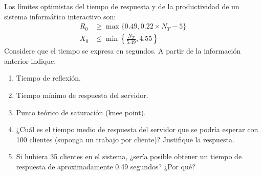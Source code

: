 \begin{ejercicio}\label{ej:5.18}
    Los límites optimistas del tiempo de respuesta y de la productividad de un sistema informático interactivo son:
    \begin{align*}
        R_0 &\geq \max\{0.49, 0.22 \times N_T - 5\} \\
        X_0 &\leq \min\left\{\frac{N_T}{5.49}, 4.55\right\}
    \end{align*}
    Considere que el tiempo se expresa en segundos. A partir de la información anterior indique:
    \begin{enumerate}
        \item Tiempo de reflexión.
        \item Tiempo mínimo de respuesta del servidor.
        \item Punto teórico de saturación (knee point).
        \item ¿Cuál es el tiempo medio de respuesta del servidor que se podría esperar con 100 clientes (suponga un trabajo por cliente)? Justifique la respuesta.
        \item Si hubiera 35 clientes en el sistema, ¿sería posible obtener un tiempo de respuesta de aproximadamente 0.49 segundos? ¿Por qué?
    \end{enumerate}
\end{ejercicio}
\begin{comment}
\solucion
    \begin{enumerate}
        \item El tiempo de reflexión es $Z = 5$ segundos.
        \item El tiempo mínimo de respuesta es $0.49$ segundos.
        \item El punto teórico de saturación es $N_T^* = 25$ clientes.
        \item El tiempo medio de respuesta esperable es de poco más de $17$ segundos.
        \item No, porque al haber más clientes que el límite teórico de saturación, ya seguro que hay colas en, al menos, el cuello de botella por lo que nunca se podría conseguir el tiempo de respuesta mínimo que precisamente es de $0.49$ segundos.
    \end{enumerate}
\end{comment}

